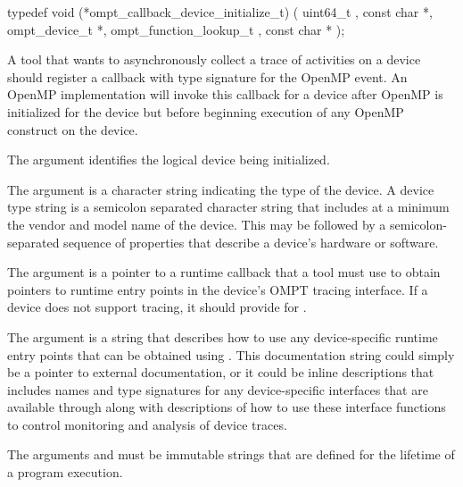 \format

\begin{ccppspecific}
\begin{omptCallback}
typedef void (*ompt_callback_device_initialize_t) (
  uint64_t ,
  const char *,
  ompt_device_t *,
  ompt_function_lookup_t ,
  const char *
);
\end{omptCallback}
\end{ccppspecific}


\descr

A tool that wants to asynchronously collect a trace of
activities on a device should register a callback with type signature
 for the
 OpenMP event. An OpenMP
implementation will invoke this callback for a device after OpenMP is
initialized for the device but before beginning execution of any
OpenMP construct on the device.

\argdesc

The argument  identifies the logical device
being initialized.

The argument  is a character string indicating the
type of the device. A device type string is a semicolon separated
character string that includes at a minimum the vendor and model name
of the device. This may be followed by a semicolon-separated sequence
of properties that describe a device's hardware or software.

\devicedesc

The argument  is a pointer to a runtime callback
that a tool must use to obtain pointers to runtime entry points in the
device's OMPT tracing interface. If a device does not support tracing,
it should provide  for .

The argument  is a string that describes
how to use any device-specific runtime
entry points that can be obtained using . This
documentation string could simply be a pointer to external
documentation, or it could be inline descriptions
that includes names and type signatures for any
device-specific interfaces that are available through 
along with descriptions of how to use these interface functions to
control monitoring and analysis of device traces.

\constraints
The arguments  and  must be
immutable strings that are defined for the lifetime of a program
execution.

